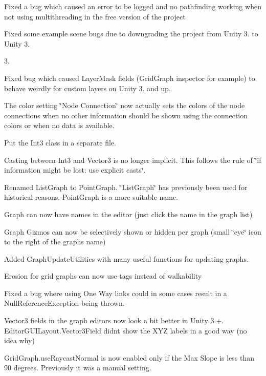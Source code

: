 \begin{DoxyItemize}
\begin{DoxyItemize}
\begin{DoxyItemize}
\item Fixed a bug which caused an error to be logged and no pathfinding working when not using multithreading in the free version of the project
\item Fixed some example scene bugs due to downgrading the project from Unity 3. to Unity 3.
\end{DoxyItemize}
\end{DoxyItemize}
\item 3.
\begin{DoxyItemize}
\item Fixed bug which caused Layer\+Mask fields (Grid\+Graph inspector for example) to behave weirdly for custom layers on Unity 3. and up.
\item The color setting \char`\"{}\+Node Connection\char`\"{} now actually sets the colors of the node connections when no other information should be shown using the connection colors or when no data is available.
\item Put the Int3 class in a separate file.
\item Casting between Int3 and Vector3 is no longer implicit. This follows the rule of \char`\"{}if information might be lost\+: use explicit casts\char`\"{}.
\item Renamed List\+Graph to Point\+Graph. \char`\"{}\+List\+Graph\char`\"{} has previously been used for historical reasons. Point\+Graph is a more suitable name.
\item Graph can now have names in the editor (just click the name in the graph list)
\item Graph Gizmos can now be selectively shown or hidden per graph (small \char`\"{}eye\char`\"{} icon to the right of the graph\textquotesingle{}s name)
\item Added Graph\+Update\+Utilities with many useful functions for updating graphs.
\item Erosion for grid graphs can now use tags instead of walkability
\item Fixed a bug where using One Way links could in some cases result in a Null\+Reference\+Exception being thrown.
\item Vector3 fields in the graph editors now look a bit better in Unity 3.+. Editor\+G\+U\+I\+Layout.\+Vector3\+Field didn\textquotesingle{}t show the X\+YZ labels in a good way (no idea why)
\item Grid\+Graph.\+use\+Raycast\+Normal is now enabled only if the Max Slope is less than 90 degrees. Previously it was a manual setting.

\end{DoxyItemize}
\end{DoxyItemize}
